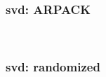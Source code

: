 \subsubsection{svd: ARPACK}
\ \clearpage
\ \clearpage

\subsubsection{svd: randomized}
\ \clearpage
\ \clearpage














